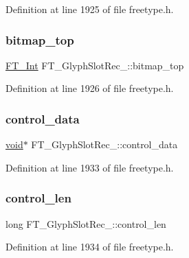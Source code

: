 Definition at line 1925 of file freetype.\+h.

\mbox{\label{struct_f_t___glyph_slot_rec___a0c150c0fb007e49fe4b9db6a69df53b7}} 
\subsubsection{\texorpdfstring{bitmap\_top}{bitmap\_top}}
{\footnotesize\ttfamily \mbox{\hyperlink{fttypes_8h_af90e5fb0d07e21be9fe6faa33f02484c}{F\+T\+\_\+\+Int}} F\+T\+\_\+\+Glyph\+Slot\+Rec\+\_\+\+::bitmap\+\_\+top}



Definition at line 1926 of file freetype.\+h.

\mbox{\label{struct_f_t___glyph_slot_rec___a2af67814d985bcdfcffdf7e8a36ebbdf}} 
\subsubsection{\texorpdfstring{control\_data}{control\_data}}
{\footnotesize\ttfamily \mbox{\hyperlink{_s_d_l__opengles2__gl2ext_8h_ae5d8fa23ad07c48bb609509eae494c95}{void}}$\ast$ F\+T\+\_\+\+Glyph\+Slot\+Rec\+\_\+\+::control\+\_\+data}



Definition at line 1933 of file freetype.\+h.

\mbox{\label{struct_f_t___glyph_slot_rec___a7a088255cb09abe42f19f650f48b6b3f}} 
\subsubsection{\texorpdfstring{control\_len}{control\_len}}
{\footnotesize\ttfamily long F\+T\+\_\+\+Glyph\+Slot\+Rec\+\_\+\+::control\+\_\+len}



Definition at line 1934 of file freetype.\+h.

